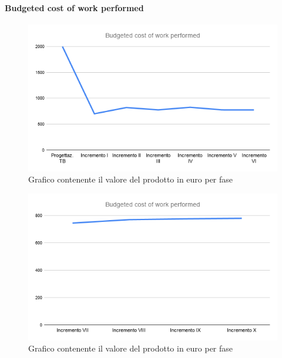 	\paragraph{Budgeted cost of work performed}
		\begin{figure}[H]
			\centering
			\includegraphics[width=0.8\linewidth]{./res/images/BCWP_1.png}
			\caption{Grafico contenente il valore del prodotto in euro per fase}
			\label{fig:Grafico contenente il valore del prodotto in euro per fase}
		\end{figure}
		\begin{figure}[H]
			\centering
			\includegraphics[width=0.8\linewidth]{./res/images/BCWP_2.png}
			\caption{Grafico contenente il valore del prodotto in euro per fase}
			\label{fig:Grafico contenente il valore del prodotto in euro per fase}
		\end{figure}

